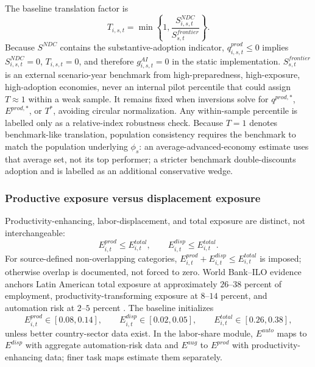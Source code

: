 \documentclass[11pt,a4paper]{article}
\begin{document}
The baseline translation factor is
\begin{equation}\label{eq:T_ndc_main_v10}
    T_{i,s,t}=\min\left\{1,\frac{S^{NDC}_{i,s,t}}{S^{frontier}_{s,t}}\right\}.
\end{equation}
Because $S^{NDC}$ contains the substantive-adoption indicator, $q^{prod}_{i,s,t}\leq0$ implies $S^{NDC}_{i,s,t}=0$, $T_{i,s,t}=0$, and therefore $g^{AI}_{i,s,t}=0$ in the static implementation.
$S^{frontier}_{s,t}$ is an external scenario-year benchmark from high-preparedness, high-exposure, high-adoption economies, never an internal pilot percentile that could assign $T\approx1$ within a weak sample. It remains fixed when inversions solve for $q^{prod,*}$, $E^{prod,*}$, or $T^*$, avoiding circular normalization. Any within-sample percentile is labelled only as a relative-index robustness check. Because $T=1$ denotes benchmark-like translation, population consistency requires the benchmark to match the population underlying $\phi_s$: an average-advanced-economy estimate uses that average set, not its top performer; a stricter benchmark double-discounts adoption and is labelled as an additional conservative wedge.

\subsubsection{Productive exposure versus displacement exposure}\label{subsec:prod_disp_exposure_main}

Productivity-enhancing, labor-displacement, and total exposure are distinct, not interchangeable:
\begin{equation}
    E^{prod}_{i,t}\leq E^{total}_{i,t},\qquad E^{disp}_{i,t}\leq E^{total}_{i,t}.
\end{equation}
For source-defined non-overlapping categories, $E^{prod}_{i,t}+E^{disp}_{i,t}\leq E^{total}_{i,t}$ is imposed; otherwise overlap is documented, not forced to zero. World Bank--ILO evidence anchors Latin American total exposure at approximately $26$--$38$ percent of employment, productivity-transforming exposure at $8$--$14$ percent, and automation risk at $2$--$5$ percent \citep{worldbankilo2024lacgenai}. The baseline initializes
\begin{equation}
    E^{prod}_{i,t}\in[0.08,0.14],\qquad
    E^{disp}_{i,t}\in[0.02,0.05],\qquad
    E^{total}_{i,t}\in[0.26,0.38],
\end{equation}
unless better country-sector data exist. In the labor-share module, $E^{auto}$ maps to $E^{disp}$ with aggregate automation-risk data and $E^{aug}$ to $E^{prod}$ with productivity-enhancing data; finer task maps estimate them separately.
\end{document}
